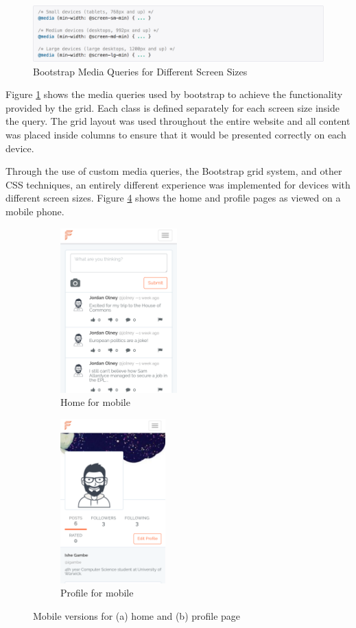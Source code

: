 \begin{figure}[H]
\centering
\includegraphics[width=1.0\textwidth]{Images/Implementation/MediaQueries}
\caption{Bootstrap Media Queries for Different Screen Sizes} \label{fig:MediaQueries}
\end{figure}

Figure \ref{fig:MediaQueries} shows the media queries used by bootstrap to achieve the functionality provided by the grid. Each class is defined separately for each screen size inside the query. The grid layout was used throughout the entire website and all content was placed inside columns to ensure that it would be presented correctly on each device.

Through the use of custom media queries, the Bootstrap grid system, and other CSS techniques, an entirely different experience was implemented for devices with different screen sizes. Figure \ref{fig:MobileView} shows the home and profile pages as viewed on a mobile phone.

\begin{figure}[H]
    \centering
    \begin{subfigure}[t]{0.45\textwidth}
        \centering
        \includegraphics[height=2.5in]{Images/Implementation/MobileHome}
        \caption{Home for mobile}\label{fig:MobileHome}        
    \end{subfigure}
    \quad
    \begin{subfigure}[t]{0.45\textwidth}
        \centering
        \includegraphics[height=2.5in]{Images/Implementation/MobileProfile}
        \caption{Profile for mobile}\label{fig:MobileProfile}
    \end{subfigure}
    \caption{Mobile versions for (a) home and (b) profile page}\label{fig:MobileView}
\end{figure}